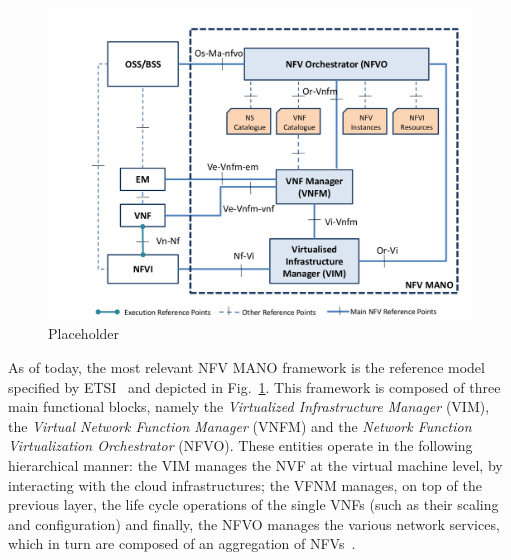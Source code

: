 \documentclass[11pt]{book}
\begin{document}
\begin{figure}[h!]
    \centering
    \includegraphics[scale=1.1]{figures/NFV.png}
     \setlength\belowcaptionskip{.1cm}
  \caption{Placeholder}
    \label{Fig:NFV_MANO}
\end{figure}
As of today, the most relevant NFV MANO framework is the reference model specified by ETSI~\cite{etsiSpec} and depicted in Fig.~\ref{Fig:NFV_MANO}. This framework is composed of three main functional blocks, namely the \textit{Virtualized Infrastructure Manager} (VIM), the \textit{Virtual Network Function Manager} (VNFM) and the \textit{Network Function Virtualization Orchestrator} (NFVO). These entities operate in the following hierarchical manner: the VIM manages the NVF at the virtual machine level, by interacting with the cloud infrastructures; the VFNM manages, on top of the previous layer, the life cycle operations of the single VNFs (such as their scaling and configuration) and finally, the NFVO manages the various network services, which in turn are composed of an aggregation of NFVs~\cite{yousaf2017nfv, etsiSpec}.
\end{document}
